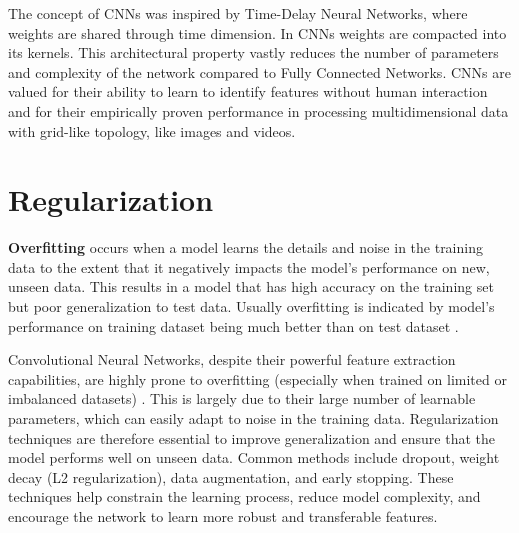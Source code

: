 The concept of CNNs was inspired by Time-Delay Neural Networks, where weights are shared through time dimension. In CNNs weights are compacted into its kernels. This architectural property vastly reduces the number of parameters and complexity of the network compared to Fully Connected Networks. CNNs are valued for their ability to learn to identify features without human interaction and for their empirically proven performance in processing multidimensional data with grid-like topology, like images and videos.

\section{Regularization}

\begin{definition}
  \textbf{Overfitting} \autocite{oshea2015introductionconvolutionalneuralnetworks} occurs when a model learns the details and noise in the training data to the extent that it negatively impacts the model’s performance on new, unseen data. This results in a model that has high accuracy on the training set but poor generalization to test data. Usually overfitting is indicated by model's performance on training dataset being much better than on test dataset \autocite{9944190}.
\end{definition}

Convolutional Neural Networks, despite their powerful feature extraction capabilities, are highly prone to overfitting (especially when trained on limited or imbalanced datasets) \autocite{alzubaidi2021review}. This is largely due to their large number of learnable parameters, which can easily adapt to noise in the training data. Regularization techniques are therefore essential to improve generalization and ensure that the model performs well on unseen data. Common methods include dropout, weight decay (L2 regularization), data augmentation, and early stopping. These techniques help constrain the learning process, reduce model complexity, and encourage the network to learn more robust and transferable features.

